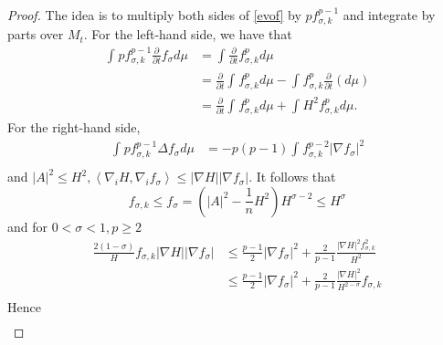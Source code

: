 \begin{proof}
    The idea is to multiply both sides of \autoref{evof} by $p f_{\sigma ,k}^{p-1} $ and integrate by parts over $M_t$.
    For the left-hand side, we have that 
    \begin{equation}
    \begin{split}
        \int_{}^{} p f_{\sigma ,k}^{p-1} \frac{\partial }{\partial t} f_{\sigma }^{} d \mu  
    &= \int_{}^{}\frac{\partial }{\partial t} f_{\sigma ,k}^{p} d \mu  \\
    &= \frac{\partial }{\partial t} \int_{}^{} f_{\sigma ,k}^{p} d \mu - \int_{}^{} f_{\sigma ,k}^{p} \frac{\partial }{\partial t} (d \mu) \\
    &= \frac{\partial }{\partial t} \int_{}^{} f_{\sigma ,k}^{p} d \mu + \int_{}^{}H^2 f_{\sigma ,k}^{p} d \mu . 
    \end{split}
    \end{equation}
    For the right-hand side, 
    \begin{equation}
    \begin{split}
        \int_{}^{} p f_{\sigma ,k}^{p-1} \Delta f_{\sigma }^{} d \mu  
    &=  -p(p-1)\int_{}^{}f_{\sigma ,k}^{p-2} \left| \nabla f_{\sigma }^{}  \right| ^2\\
    \end{split}
    \end{equation} 
    and $ \left| A \right| ^2 \leq H^2, \left\langle \nabla _i H, \nabla_{i}^{} f_\sigma  \right\rangle \leq \left| \nabla H \right| \left| \nabla f_{\sigma }^{}  \right| .$ 
    It follows that 
    \[f_{\sigma ,k}^{} \leq f_{\sigma }^{} = \left( \left| A \right| ^2-\frac{1}{n}H^2 \right) H^{\sigma-2} \leq H^{\sigma } \]
    and for $0<\sigma <1, p \geq 2$ 
    \begin{equation}
    \begin{split}
        \frac{2(1-\sigma )}{H}f_{\sigma,k }^{} \left| \nabla H \right| \left| \nabla f_{\sigma }^{}  \right| 
    &\leq \frac{p-1}{2} \left| \nabla f_{\sigma }^{}  \right|^2 + \frac{2}{p-1} \frac{\left| \nabla H \right| ^2 f_{\sigma ,k}^{2} }{H^2}  \\
    & \leq \frac{p-1}{2} \left| \nabla f_{\sigma }^{}  \right|^2 + \frac{2}{p-1} \frac{\left| \nabla H \right| ^2 }{H^{2-\sigma }} f_{\sigma ,k}^{}   \\
    \end{split}
    \end{equation} 
    Hence
    \begin{equation}
        \begin{split}

\end{split}
\end{equation}
\end{proof}
